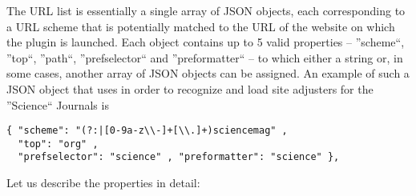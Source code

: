 \documentclass[
a4paper,
12pt,
]
{article}
\begin{document}
 The URL list is essentially a single array of JSON objects, each corresponding to a URL scheme that is potentially matched to the URL of the website on which the plugin is launched. Each object contains up to 5 valid properties -- ''scheme``, ''top``, ''path``, ''prefselector`` and ''preformatter`` -- to which either a string or, in some cases, another array of JSON objects can be assigned. An example of such a JSON object that \plgname uses in order to recognize and load site adjusters for the ''Science`` Journals is
 \begin{center}
\begin{lstlisting}
{ "scheme": "(?:|[0-9a-z\\-]+[\\.]+)sciencemag" ,
  "top": "org" ,
  "prefselector": "science" , "preformatter": "science" },
\end{lstlisting}
\end{center}
 Let us describe the properties in detail:
\end{document}

